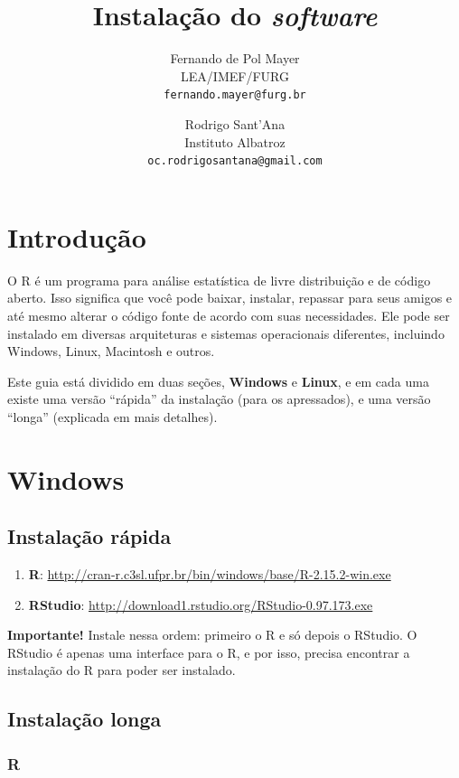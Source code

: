 \documentclass[a4paper,12pt]{article}\usepackage[]{graphicx}\usepackage[]{color}
\title{Instalação do \textit{software} \R}
\author{Fernando de Pol Mayer \\
  LEA/IMEF/FURG \\
  \texttt{fernando.mayer@furg.br} \and Rodrigo Sant'Ana \\
  Instituto Albatroz \\
  \texttt{oc.rodrigosantana@gmail.com}}
\date{}
\providecommand{\R}{\textsf{R}\xspace}
\providecommand{\RStudio}{\textsf{RStudio}\xspace}
\begin{document}
\maketitle
\tableofcontents

\section{Introdução}

O \R é um programa para análise estatística de livre distribuição e de
código aberto. Isso significa que você pode baixar, instalar, repassar
para seus amigos e até mesmo alterar o código fonte de acordo com suas
necessidades. Ele pode ser instalado em diversas arquiteturas e sistemas
operacionais diferentes, incluindo Windows, Linux, Macintosh e
outros.

Este guia está dividido em duas seções, \textbf{Windows} e
\textbf{Linux}, e em cada uma existe uma versão ``rápida'' da instalação
(para os apressados), e uma versão ``longa'' (explicada em mais
detalhes).

\section{Windows}

\subsection{Instalação rápida}

\begin{enumerate}
\item \textbf{\R}:
  \url{http://cran-r.c3sl.ufpr.br/bin/windows/base/R-2.15.2-win.exe}
\item \textbf{\RStudio}:
  \url{http://download1.rstudio.org/RStudio-0.97.173.exe}
\end{enumerate}

\textbf{Importante!} Instale nessa ordem: primeiro o \R e só depois o
\RStudio. O \RStudio é apenas uma interface para o \R, e por isso,
precisa encontrar a instalação do \R para poder ser instalado.

\subsection{Instalação longa}

\subsubsection{\R}
\end{document}
